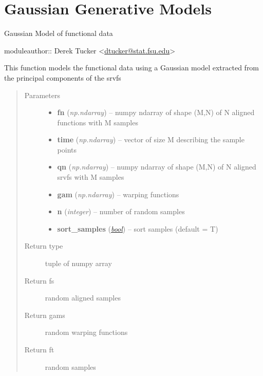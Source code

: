 \documentclass[letterpaper,10pt,english]{sphinxmanual}
\begin{document}
\chapter{Gaussian Generative Models}
\label{gauss_model:module-gauss_model}\label{gauss_model::doc}\label{gauss_model:gaussian-generative-models}
Gaussian Model of functional data

moduleauthor:: Derek Tucker \textless{}\href{mailto:dtucker@stat.fsu.edu}{dtucker@stat.fsu.edu}\textgreater{}

\begin{fulllineitems}
\label{gauss_model:gauss_model.gauss_model}
This function models the functional data using a Gaussian model
extracted from the principal components of the srvfs
\begin{quote}\begin{description}
\item[{Parameters}] \leavevmode\begin{itemize}
\item {} 
\textbf{fn} (\emph{np.ndarray}) -- numpy ndarray of shape (M,N) of N aligned functions with
M samples

\item {} 
\textbf{time} (\emph{np.ndarray}) -- vector of size M describing the sample points

\item {} 
\textbf{qn} (\emph{np.ndarray}) -- numpy ndarray of shape (M,N) of N aligned srvfs with M samples

\item {} 
\textbf{gam} (\emph{np.ndarray}) -- warping functions

\item {} 
\textbf{n} (\emph{integer}) -- number of random samples

\item {} 
\textbf{sort\_samples} (\href{http://docs.python.org/library/functions.html\#bool}{\emph{bool}}) -- sort samples (default = T)

\end{itemize}

\item[{Return type}] \leavevmode
tuple of numpy array

\item[{Return fs}] \leavevmode
random aligned samples

\item[{Return gams}] \leavevmode
random warping functions

\item[{Return ft}] \leavevmode
random samples

\end{description}\end{quote}

\end{fulllineitems}
\end{document}
